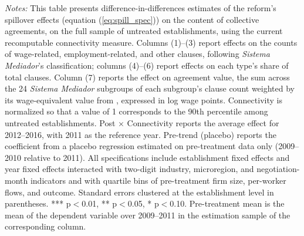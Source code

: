 \begin{table}[H]
\begin{minipage}{\linewidth}
    \textit{Notes:} This table presents difference-in-differences estimates of the reform's spillover effects (equation (\ref{eq:spill_spec})) on the content of collective agreements, on the full sample of untreated establishments, using the current recomputable connectivity measure. Columns (1)--(3) report effects on the counts of wage-related, employment-related, and other clauses, following \textit{Sistema Mediador}'s classification; columns (4)--(6) report effects on each type's share of total clauses. Column (7) reports the effect on agreement value, the sum across the 24 \textit{Sistema Mediador} subgroups of each subgroup's clause count weighted by its wage-equivalent value from \citet{Lagos2026}, expressed in log wage points. Connectivity is normalized so that a value of 1 corresponds to the 90th percentile among untreated establishments. Post $\times$ Connectivity reports the average effect for 2012--2016, with 2011 as the reference year. Pre-trend (placebo) reports the coefficient from a placebo regression estimated on pre-treatment data only (2009--2010 relative to 2011). All specifications include establishment fixed effects and year fixed effects interacted with two-digit industry, microregion, and negotiation-month indicators and with quartile bins of pre-treatment firm size, per-worker flows, and outcome. Standard errors clustered at the establishment level in parentheses. *** p$<$0.01, ** p$<$0.05, * p$<$0.10. Pre-treatment mean is the mean of the dependent variable over 2009--2011 in the estimation sample of the corresponding column.
\end{minipage}
\end{table}
